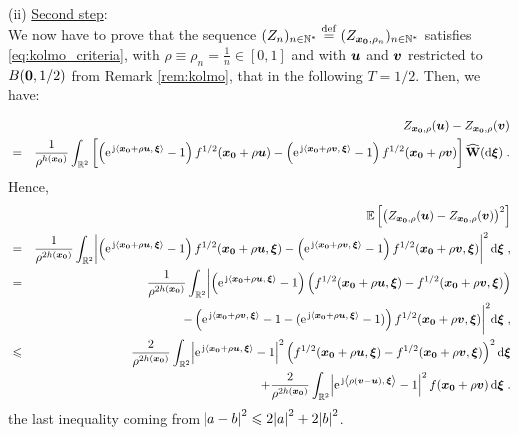 \documentclass{elsarticle}
\begin{document}
\

(ii) \underline{Second step}: \\

We now have to prove that the sequence $(Z_n)_{n\in \mathbb{N}^{\ast}}\overset{\mathrm{def}}{=}(Z_{\bm{x_0},\rho_n})_{n\in \mathbb{N}^{\ast}}$ satisfies \eqref{eq:kolmo_criteria}, with $\rho\equiv \rho_n=\frac{1}{n} \in [0,1]$ and with $\bm{u}$ and $\bm{v}$ restricted to $B(\bm{0},1/2)$ from Remark \ref{rem:kolmo}, that in the following $T=1/2$. Then, we have:



\begin{eqnarray*}
&&Z_{\bm{x_0},\rho}(\bm{u})-Z_{\bm{x_0},\rho}(\bm{v})\\
&=&\frac{1}{\rho^{h(\bm{x_0})}} \int_{ \mathbb{R}^2}^{} \left[\left(\mathrm{e}^{\, \mathrm{j} \left \langle \bm{x_0}+\rho \bm{u},\, \bm{\xi}\right \rangle}-1\right)f^{1/2}(\bm{x_0}+\rho \bm{u})-\left(\mathrm{e}^{\, \mathrm{j} \left \langle \bm{x_0}+\rho \bm{v},\, \bm{\xi}\right \rangle}-1\right)f^{1/2}(\bm{x_0}+\rho \bm{v})\right]\widehat{\mathbf{W}}(\mathop{}\mathopen{}\mathrm{d} \bm{\xi})\;.
\end{eqnarray*}
Hence,
\begin{eqnarray*}
&& \mathbb{E}\left[\left(Z_{\vect{x_0},\rho}(\vect{u})-Z_{\vect{x_0},\rho}(\vect{v})\right)^2\right]\\
&=&\frac{1}{\rho^{2h(\vect{x_0})}} \int_{ \mathbb{R}^2}^{} \abs{\left(\expj{\ip{\vect{x_0}+\rho \vect{u}}{\vect{\xi}}}-1\right)f^{1/2}(\vect{x_0}+\rho \vect{u},\vect{\xi})-\left(\expj{\ip{\vect{x_0}+\rho \vect{v}}{\vect{\xi}}}-1\right)f^{1/2}(\vect{x_0}+\rho \vect{v},\vect{\xi})}^2\dif \vect{\xi}\;,\\
&=&\frac{1}{\rho^{2h(\vect{x_0})}} \int_{ \mathbb{R}^2}^{} \biggl|\left(\expj{\ip{\vect{x_0}+\rho \vect{u}}{\vect{\xi}}}-1\right)\left(f^{1/2}(\vect{x_0}+\rho \vect{u},\vect{\xi})-f^{1/2}(\vect{x_0}+\rho \vect{v},\vect{\xi})\right)\\
&&\qquad \qquad \qquad  -\left(\expj{\ip{\vect{x_0}+\rho \vect{v}}{\vect{\xi}}}-1-(\expj{\ip{\vect{x_0}+\rho \vect{u}}{\vect{\xi}}}-1)\right)f^{1/2}(\vect{x_0}+\rho \vect{v},\vect{\xi})\biggl|^2\dif \vect{\xi}\;,\\
&\leq & \frac{2}{\rho^{2h(\vect{x_0})}} \int_{ \mathbb{R}^2}^{} \abs{\expj{\ip{\vect{x_0}+\rho \vect{u}}{\vect{\xi}}}-1}^2\left(f^{1/2}(\vect{x_0}+\rho \vect{u},\vect{\xi})-f^{1/2}(\vect{x_0}+\rho \vect{v},\vect{\xi})\right)^2\diff \vect{\xi}\\
&&+\frac{2}{\rho^{2h(\vect{x_0})}} \int_{ \mathbb{R}^2} \abs{\expj{\ip{\rho (\vect{v}-\vect{u})}{\vect{\xi}}}-1}^2 f(\vect{x_0}+\rho \vect{v})\diff \vect{\xi}\;.
\end{eqnarray*}
the last inequality coming from $\abs{a-b}^2\leqslant 2\abs{a}^2+2\abs{b}^2$.
\end{document}
